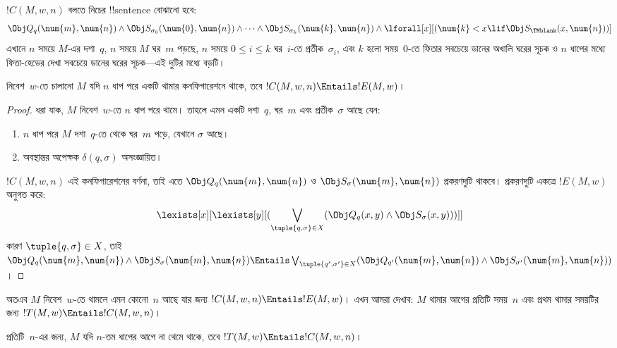 \documentclass[../../../include/open-logic-section]{subfiles}
\begin{document}
\begin{defn}
$!C(M,w,n)$ বলতে নিচের !!{sentence} বোঝানো হবে:
\[
\Obj Q_q(\num{m}, \num{n}) \land \Obj S_{\sigma_0}(\num{0}, \num{n})
\land \dots \land \Obj S_{\sigma_k}(\num{k}, \num{n}) \land
\lforall[x][(\num{k} < x \lif \Obj S_\TMblank(x, \num{n}))]
\]
এখানে $n$ সময়ে $M$-এর দশা~$q$, $n$ সময়ে $M$ ঘর~$m$ পড়ছে, $n$ সময়ে
$0\le i\le k$ ঘর~$i$-তে প্রতীক~$\sigma_i$, এবং $k$ হলো সময়~$0$-তে
ফিতার সবচেয়ে ডানের অখালি ঘরের সূচক ও $n$ ধাপের মধ্যে ফিতা-হেডের দেখা
সবচেয়ে ডানের ঘরের সূচক—এই দুটির মধ্যে বড়টি।
\end{defn}

\begin{lem}
নিবেশ~$w$-তে চালানো $M$ যদি $n$ ধাপ পরে একটি থামার কনফিগারেশনে থাকে,
তবে $!C(M,w,n)\Entails !E(M,w)$।
\end{lem}

\begin{proof}
ধরা যাক, $M$ নিবেশ~$w$-তে $n$ ধাপ পরে থামে। তাহলে এমন একটি দশা~$q$,
ঘর~$m$ এবং প্রতীক~$\sigma$ আছে যেন:
\begin{enumerate}
\item $n$ ধাপ পরে $M$ দশা~$q$-তে থেকে ঘর~$m$ পড়ে, যেখানে
  $\sigma$ আছে।
\item অবস্থান্তর অপেক্ষক $\delta(q,\sigma)$ অসংজ্ঞায়িত।
\end{enumerate}
$!C(M,w,n)$ এই কনফিগারেশনের বর্ণনা, তাই এতে
$\Obj Q_{q}(\num{m},\num{n})$ ও
$\Obj S_{\sigma}(\num{m},\num{n})$ প্রকরণদুটি থাকবে। প্রকরণদুটি একত্রে
$!E(M,w)$ অনুগত করে:
\[
\lexists[x][\lexists[y][(\bigvee_{\tuple{q, \sigma} \in
      X}(\Obj Q_q(x, y) \land \Obj S_\sigma(x, y)))]]
\]
কারণ $\tuple{q,\sigma}\in X$, তাই
$\Obj Q_q(\num{m},\num{n})\land\Obj S_\sigma(\num{m},\num{n})
\Entails \bigvee_{\tuple{q',\sigma'}\in X}
(\Obj Q_{q'}(\num{m},\num{n})\land
\Obj S_{\sigma'}(\num{m},\num{n}))$।

\end{proof}

\begin{explain}
অতএব $M$ নিবেশ~$w$-তে থামলে এমন কোনো~$n$ আছে যার জন্য
$!C(M,w,n)\Entails !E(M,w)$। এখন আমরা দেখাব: $M$ থামার আগের প্রতিটি
সময়~$n$ এবং প্রথম থামার সময়টির জন্য
$!T(M,w)\Entails !C(M,w,n)$।
\end{explain}

\begin{lem}
প্রতিটি~$n$-এর জন্য, $M$ যদি $n$-তম ধাপের আগে না থেমে থাকে, তবে
$!T(M,w)\Entails !C(M,w,n)$।
\end{lem}
\end{document}

